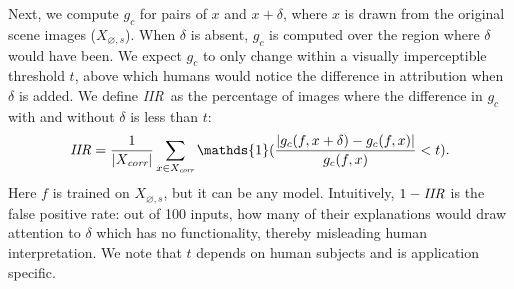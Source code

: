 \documentclass[twoside]{article}
\newcommand{\IIR}{\textit{IIR}}
\begin{document}
Next, we compute $g_c$ for pairs of $x$ and $x + \delta$, where $x$ is drawn from the original scene images ($X_{\varnothing,s}$). When $\delta$ is absent, $g_c$ is computed over the region where $\delta$ would have been. We expect $g_c$ to only change within a visually imperceptible threshold $t$, above which humans would notice the difference in attribution when $\delta$ is added. We define \IIR~as the percentage of images where the difference in $g_c$ with and without $\delta$ is less than $t$:
$$
\textrm{\IIR} = \frac{1}{|X_{\textit{corr}}|}\sum\limits_{x \in X_{\textit{corr}}} \mathds{1}(\frac{|g_c(f, x + \delta) - g_c(f, x)|}{g_c(f, x)} < t). $$
Here $f$ is trained on $X_{\varnothing,s}$, but it can be any model. Intuitively, $1-\textrm{\IIR}$ is the false positive rate: out of 100 inputs, how many of their explanations would draw attention to $\delta$ which has no functionality, thereby misleading human interpretation. We note that $t$ depends on human subjects and is application specific.
\end{document}
